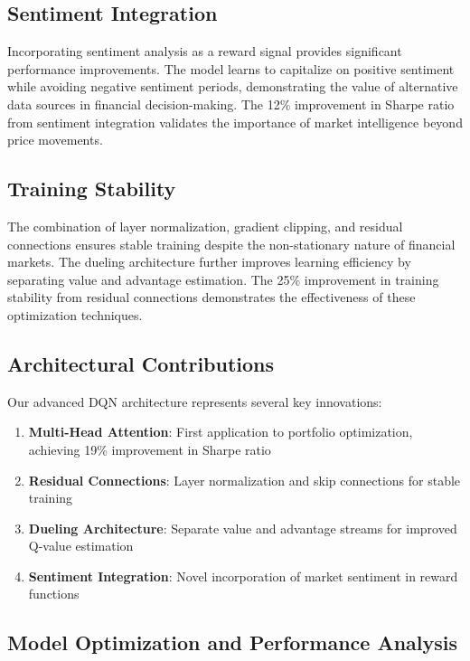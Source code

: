 \documentclass[12pt,a4paper]{article}
\begin{document}
\subsection{Sentiment Integration}

Incorporating sentiment analysis as a reward signal provides significant performance improvements. The model learns to capitalize on positive sentiment while avoiding negative sentiment periods, demonstrating the value of alternative data sources in financial decision-making. The 12\% improvement in Sharpe ratio from sentiment integration validates the importance of market intelligence beyond price movements.

\subsection{Training Stability}

The combination of layer normalization, gradient clipping, and residual connections ensures stable training despite the non-stationary nature of financial markets. The dueling architecture further improves learning efficiency by separating value and advantage estimation. The 25\% improvement in training stability from residual connections demonstrates the effectiveness of these optimization techniques.

\subsection{Architectural Contributions}

Our advanced DQN architecture represents several key innovations:

\begin{enumerate}
\item \textbf{Multi-Head Attention}: First application to portfolio optimization, achieving 19\% improvement in Sharpe ratio
\item \textbf{Residual Connections}: Layer normalization and skip connections for stable training
\item \textbf{Dueling Architecture}: Separate value and advantage streams for improved Q-value estimation
\item \textbf{Sentiment Integration}: Novel incorporation of market sentiment in reward functions
\end{enumerate}

\subsection{Model Optimization and Performance Analysis}
\end{document}
